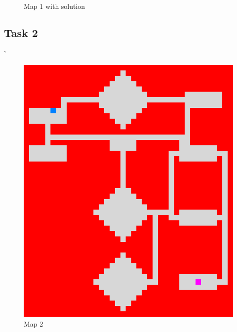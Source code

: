 \documentclass{article}
\begin{document}
\begin{figure}[h!!!!]
\begin{minipage}{0.4\textwidth}
    		\caption{Map 1 with solution}
	\end{minipage}
\end{figure}


\subsection{Task 2}
'\begin{figure}[!h]
	\centering
	\begin{minipage}{0.4\textwidth}
		\includegraphics[width=\textwidth]{images/map2}
    		\caption{Map 2}
	\end{minipage}
	\hfill
	\begin{minipage}{0.4\textwidth}

\end{minipage}
\end{figure}
\end{document}

